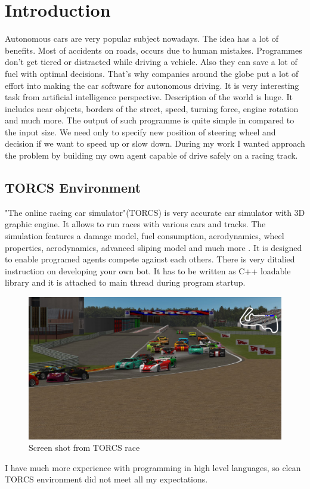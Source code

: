 \documentclass[declaration,shortabstract,english,inz]{iithesis}
\author         {Kacper Kulczak}
\begin{document}

\chapter{Introduction}

Autonomous cars are very popular subject nowadays. The idea has a lot of benefits. Most of accidents on roads, occurs due to human mistakes. Programmes don't get tiered or distracted while driving a vehicle. Also they can save a lot of fuel with optimal decisions.
That's why companies around the globe put a lot of effort into making the car software for autonomous driving. It is very interesting task from artificial intelligence perspective. Description of the world is huge. It includes near objects, borders of the street, speed, turning force, engine rotation and much more. The output of such programme is quite simple in compared to the input size. We need only to specify new position of steering wheel and decision if we want to speed up or slow down. During my work I wanted approach the problem by building my own agent capable of drive safely on a racing track.




\section{TORCS Environment}
"The online racing car simulator"(TORCS) is very accurate car simulator with 3D graphic engine. It allows to run races with various cars and tracks. The simulation features a damage model, fuel consumption, aerodynamics, wheel properties, aerodynamics, advanced sliping model and much more \cite{TORCS}.  It is designed to enable programed agents compete against each others. There is very ditalied instruction on developing your  own bot. It has to be written as C++ loadable library and it is attached to main thread during program startup.


\begin{figure}[h]
    \includegraphics[width=\linewidth]{img/torcs_look.jpeg}
    \caption{Screen shot from TORCS race \cite{TORCS}}
    \label{fig:torcs}
\end{figure}
I have much more experience with programming in high level languages, so clean TORCS environment did not meet all my expectations. 
\end{document}
